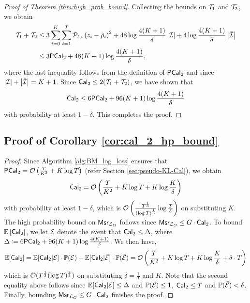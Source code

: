 \begin{proof}[Proof of Theorem \ref{thm:high_prob_bound}]
Collecting the bounds on $\cT_{1}$ and $\cT_{2}$, we obtain \begin{align*}
    \cT_{1} + \cT_{2} &\le 3 \sum_{i = 0} ^ {K} \sum_{t = 1} ^ {T} \cP_{t, i} \bigc{z_{i} - \tilde{\rho}_{i}} ^ 2 + 48 \log \frac{4(K+1)}{\delta}\abs{\cI} + 4 \log \frac{4 (K + 1)}{\delta} \abs{\bar{\cI}} \\
    &\le 3 \pcal_{2} + 48 (K + 1)\log \frac{4(K + 1)}{\delta},
\end{align*}
where the last inequality follows from the definition of $\pcal_{2}$ and since $\abs{\cI} + \abs{\bar{\cI}} = K + 1$. Since $\cal_{2} \le 2(\cT_{1} + \cT_{2})$, we have shown that \begin{align}\label{eq:hp_bound_cal_2}
    \cal_{2} \le 6 \pcal_{2} + 96 (K + 1)\log \frac{4(K + 1)}{\delta}
\end{align}
with probability at least $1 - \delta$. This completes the proof.
\end{proof}

\subsection{Proof of Corollary \ref{cor:cal_2_hp_bound}}
 \begin{proof}
Since Algorithm \ref{alg:BM_log_loss} ensures that $\pcal_{2} = \cO\bigc{\frac{T}{K ^ {2}} + K \log T}$ (refer Section \ref{sec:pseudo-KL-Cal}), we obtain \begin{align*}
    \cal_{2} = \cO\bigc{\frac{T}{K ^ {2}} + K \log T + K \log \frac{K}{\delta}}
\end{align*}
with probability at least $1 - \delta$, which is $\cO\bigc{\frac{T ^ {\frac{1}{3}}}{(\log T) ^ {\frac{1}{3}}} \log \frac{T}{\delta}}$ on substituting $K$. The high probability bound on $\msr_{\cL_{G}}$ follows since $\msr_{\cL_{G}} \le G \cdot \cal_{2}$. To bound $\mathbb{E}\bigs{\cal_{2}}$, we let $\cE$ denote the event that $\cal_{2} \le \Delta$, where $\Delta \coloneqq 6 \pcal_{2} + 96 (K + 1) \log \frac{4(K + 1)}{\delta}$. We then have, \begin{align*}
    \mathbb{E}[\cal_{2}] = \mathbb{E}[\cal_{2} | \cE]\cdot \mathbb{P}(\cE) + \mathbb{E}[\cal_{2} | \bar{\cE}] \cdot \mathbb{P}(\bar{\cE}) = \cO\bigc{\frac{T}{K ^ 2} + K \log T + K\log \frac{K}{\delta} + \delta \cdot T}
\end{align*}
which is $\cO(T^{\frac{1}{3}} (\log T)^{\frac{2}{3}})$ on substituting $\delta = \frac{1}{T}$ and $K$. Note that the second equality above follows since $\mathbb{E}[\cal_{2} | \cE] \le \Delta$ and $\mathbb{P}(\cE) \le 1$, $\cal_{2} \le T$ and $\mathbb{P}(\bar{\cE}) < \delta$. Finally, bounding $\msr_{\cL_{G}} \le G \cdot \cal_{2}$ finishes the proof.
\end{proof}
